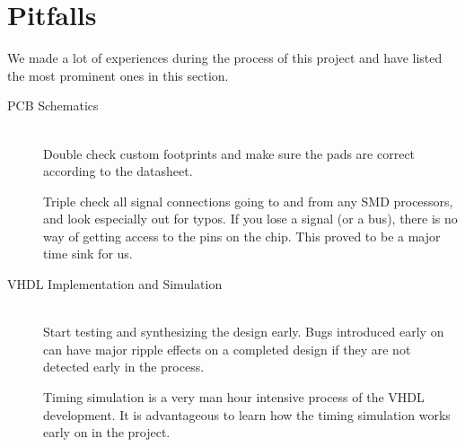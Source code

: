 
\section{Pitfalls}

We made a lot of experiences during the process of this project and have listed the most prominent ones in this section.

\begin{description}
   \item[PCB Schematics] \hfill \\
   Double check custom footprints and make sure the pads are correct according to the datasheet.

Triple check all signal connections going to and from any SMD processors, and look especially out for typos. If you lose a signal (or a bus), there is no way of getting access to the pins on the chip. This proved to be a major time sink for us.
   \item[VHDL Implementation and Simulation] \hfill \\
   Start testing and synthesizing the design early. Bugs introduced early on can have major ripple effects on a completed design if they are not detected early in the process.

Timing simulation is a very man hour intensive process of the VHDL development. It is advantageous to learn how the timing simulation works early on in the project.
\end{description}